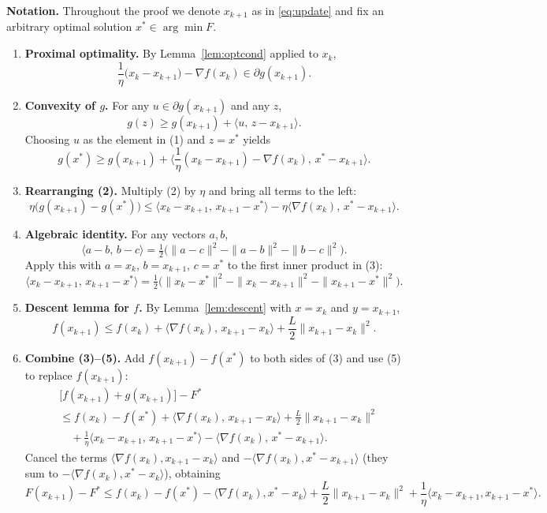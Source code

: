 \documentclass{article}
\begin{document}
\noindent\textbf{Notation.} Throughout the proof we denote $x_{k+1}$ as in \eqref{eq:update} and fix an arbitrary optimal solution $x^{*}\in\arg\min F$.

\begin{enumerate}[label=[Step \arabic*], leftmargin=*]
\item \textbf{Proximal optimality.} By Lemma~\ref{lem:optcond} applied to $x_{k}$,
\[
\frac{1}{\eta}\bigl(x_{k}-x_{k+1}\bigr)-\nabla f(x_{k})\in\partial g(x_{k+1}).
\tag{1}
\]

\item \textbf{Convexity of $g$.} For any $u\in\partial g(x_{k+1})$ and any $z$,
\[
g(z)\ge g(x_{k+1})+\langle u,\,z-x_{k+1}\rangle .
\]
Choosing $u$ as the element in (1) and $z=x^{*}$ yields
\[
g(x^{*})\ge g(x_{k+1})+\Big\langle \frac{1}{\eta}(x_{k}-x_{k+1})-\nabla f(x_{k}),\,x^{*}-x_{k+1}\Big\rangle .
\tag{2}
\]

\item \textbf{Rearranging (2).} Multiply (2) by $\eta$ and bring all terms to the left:
\[
\eta\bigl(g(x_{k+1})-g(x^{*})\bigr)
\le \langle x_{k}-x_{k+1},\,x_{k+1}-x^{*}\rangle-\eta\langle\nabla f(x_{k}),\,x^{*}-x_{k+1}\rangle .
\tag{3}
\]

\item \textbf{Algebraic identity.} For any vectors $a,b$,
\[
\langle a-b,\,b-c\rangle =\tfrac12\bigl(\|a-c\|^{2}-\|a-b\|^{2}-\|b-c\|^{2}\bigr).
\]
Apply this with $a=x_{k}$, $b=x_{k+1}$, $c=x^{*}$ to the first inner product in (3):
\[
\langle x_{k}-x_{k+1},\,x_{k+1}-x^{*}\rangle
=\tfrac12\bigl(\|x_{k}-x^{*}\|^{2}-\|x_{k}-x_{k+1}\|^{2}-\|x_{k+1}-x^{*}\|^{2}\bigr).
\tag{4}
\]

\item \textbf{Descent lemma for $f$.} By Lemma~\ref{lem:descent} with $x=x_{k}$ and $y=x_{k+1}$,
\[
f(x_{k+1})\le f(x_{k})+\langle\nabla f(x_{k}),\,x_{k+1}-x_{k}\rangle+\frac{L}{2}\|x_{k+1}-x_{k}\|^{2}.
\tag{5}
\]

\item \textbf{Combine (3)–(5).} Add $f(x_{k+1})-f(x^{*})$ to both sides of (3) and use (5) to replace $f(x_{k+1})$:
\begin{align*}
&\bigl[f(x_{k+1})+g(x_{k+1})\bigr]-F^{*}\\
&\le f(x_{k})-f(x^{*})+\langle\nabla f(x_{k}),\,x_{k+1}-x_{k}\rangle
+\frac{L}{2}\|x_{k+1}-x_{k}\|^{2}\\
&\quad +\frac{1}{\eta}\langle x_{k}-x_{k+1},\,x_{k+1}-x^{*}\rangle
-\langle\nabla f(x_{k}),\,x^{*}-x_{k+1}\rangle .
\end{align*}
Cancel the terms $\langle\nabla f(x_{k}),x_{k+1}-x_{k}\rangle$ and $-\langle\nabla f(x_{k}),x^{*}-x_{k+1}\rangle$ (they sum to $-\langle\nabla f(x_{k}),x^{*}-x_{k}\rangle$), obtaining
\[
F(x_{k+1})-F^{*}\le f(x_{k})-f(x^{*})-\langle\nabla f(x_{k}),x^{*}-x_{k}\rangle
+\frac{L}{2}\|x_{k+1}-x_{k}\|^{2}
+\frac{1}{\eta}\langle x_{k}-x_{k+1},x_{k+1}-x^{*}\rangle .
\tag{6}
\]


\end{enumerate}
\end{document}
